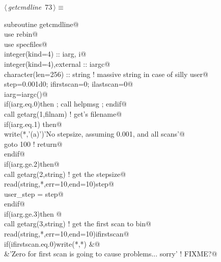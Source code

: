 \documentclass[10pt,a4paper,notitlepage]{article}
\begin{document}
\begin{flushleft} \small
\begin{minipage}{\linewidth}\label{scrap82}\raggedright\small
{} $\langle\,${\it getcmdline}\nobreak\ {\footnotesize {73}}$\,\rangle\equiv$
\vspace{-1ex}
\begin{list}{}{} \item
\mbox{}\verb@      subroutine getcmdline@\\
\mbox{}\verb@      use rebin@\\
\mbox{}\verb@      use specfiles@\\
\mbox{}\verb@      integer(kind=4) :: iarg, i@\\
\mbox{}\verb@      integer(kind=4),external :: iargc@\\
\mbox{}\verb@      character(len=256) :: string ! massive string in case of silly user@\\
\mbox{}\verb@      step=0.001d0; ifirstscan=0; ilastscan=0@\\
\mbox{}\verb@      iarg=iargc()@\\
\mbox{}\verb@      if(iarg.eq.0)then ; call helpmsg ; endif@\\
\mbox{}\verb@      call getarg(1,filnam) ! get's filename@\\
\mbox{}\verb@      if(iarg.eq.1) then@\\
\mbox{}\verb@        write(*,'(a)')'No stepsize, assuming 0.001, and all scans'@\\
\mbox{}\verb@        goto 100 ! return@\\
\mbox{}\verb@      endif@\\
\mbox{}\verb@      if(iarg.ge.2)then@\\
\mbox{}\verb@        call getarg(2,string)   ! get the stepsize@\\
\mbox{}\verb@        read(string,*,err=10,end=10)step@\\
\mbox{}\verb@        user_step = step@\\
\mbox{}\verb@      endif@\\
\mbox{}\verb@      if(iarg.ge.3)then      @\\
\mbox{}\verb@        call getarg(3,string)   ! get the first scan to bin@\\
\mbox{}\verb@        read(string,*,err=10,end=10)ifirstscan@\\
\mbox{}\verb@        if(ifirstscan.eq.0)write(*,*)                                   &@\\
\mbox{}\verb@     &'Zero for first scan is going to cause problems... sorry' ! FIXME?@\\

\end{list}
\end{minipage}
\end{flushleft}
\end{document}
